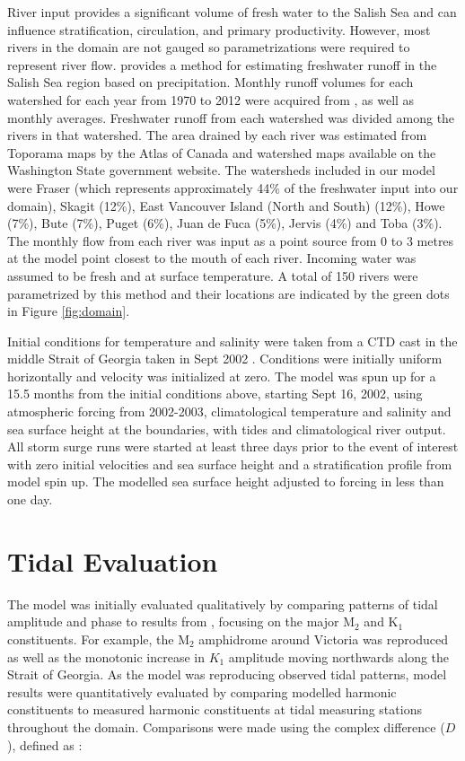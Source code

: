 \documentclass{tATO2e}
\begin{document}
River input provides a significant volume of fresh water to the Salish Sea and can influence stratification, circulation, and primary productivity. However, most rivers in the domain are not gauged so parametrizations were required to represent river flow. \citet{morrison2011rivers} provides a method for estimating freshwater runoff in the Salish Sea region based on precipitation. Monthly runoff volumes for each watershed for each year from 1970 to 2012 were acquired from \citet{morrison2011rivers}, as well as monthly averages. Freshwater runoff from each watershed was divided among the rivers in that watershed. The area drained by each river was estimated from Toporama maps by the Atlas of Canada and watershed maps available on the Washington State government website. The watersheds included in our model were Fraser (which represents approximately 44\% of the freshwater input into our domain), Skagit (12\%), East Vancouver Island (North and South) (12\%), Howe (7\%), Bute (7\%), Puget (6\%), Juan de Fuca (5\%), Jervis (4\%) and Toba (3\%). The monthly flow from each river was input as a point source from 0 to 3 metres at the model point closest to the mouth of each river. Incoming water was assumed to be fresh and at surface temperature. A total of 150 rivers were parametrized by this method and their locations are indicated by the green dots in Figure \ref{fig:domain}.

Initial conditions for temperature and salinity were taken from a CTD cast in the middle Strait of Georgia taken in Sept 2002 \citep{pawlowiczetal2007}. Conditions were initially uniform horizontally and velocity was initialized at zero. The model was spun up for a 15.5 months from the initial conditions above, starting Sept 16, 2002, using atmospheric forcing from 2002-2003, climatological temperature and salinity and sea surface height at the boundaries, with tides and climatological river output.  All storm surge runs were started at least three days prior to the event of interest with zero initial velocities and sea surface height and a stratification profile from model spin up. The modelled sea surface height adjusted to forcing in less than one day. 

\section{Tidal Evaluation}\label{sec:model}

The model was initially evaluated qualitatively by comparing patterns of tidal amplitude and phase to results from \citet{foreman1995tidal}, focusing on the major M$_2$ and K$_1$ constituents. For example, the M$_2$ amphidrome around Victoria was reproduced as well as the monotonic increase in $K_1$ amplitude moving northwards along the Strait of Georgia. As the model was reproducing observed tidal patterns, model results were quantitatively evaluated by comparing modelled harmonic constituents to measured harmonic constituents at tidal measuring stations throughout the domain. Comparisons were made using the complex difference ($D$), defined as \citep{foreman1995tidal}:
\end{document}
